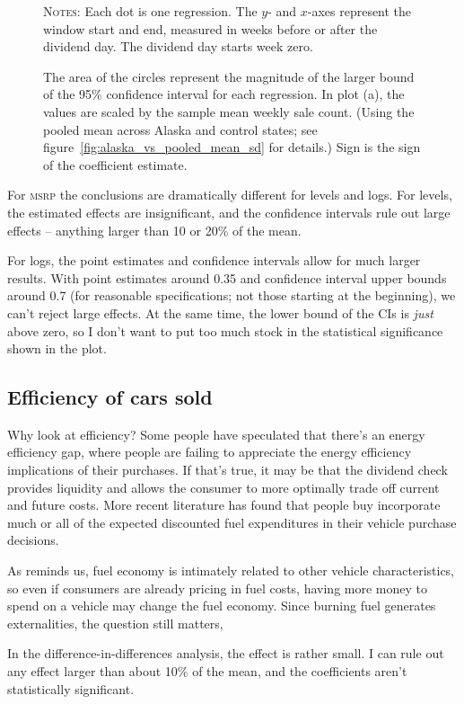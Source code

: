 \documentclass[11pt,letterpaper,oneside]{article}
\newcommand{\msrp}{\textsc{msrp}}
\newcommand{\varWindowDDnotes}{%
Each dot is one regression.
The $y$- and $x$-axes represent the window start and end, measured in weeks before or after the dividend day.
The dividend day starts week zero.

 The area of the circles represent the magnitude of the larger bound of the 95\% confidence interval for each regression.
In plot (a), the values are scaled by the sample mean weekly sale count.
(Using the pooled mean across Alaska and control states; see figure~\ref{fig:alaska_vs_pooled_mean_sd} for details.)
Sign is the sign of the coefficient estimate. %
}
\begin{document}
\begin{doublespacing}
\begin{figure}[!hbtp]
    {\footnotesize
    \textsc{Notes:}
    \varWindowDDnotes
    }
\end{figure}


For \msrp{} the conclusions are dramatically different for levels and logs.
    For levels, the estimated effects are insignificant, and the confidence intervals rule out large effects -- anything larger than 10 or 20\% of the mean.

    For logs, the point estimates and confidence intervals allow for much larger results.
    With point estimates around 0.35 and confidence interval upper bounds around 0.7 (for reasonable specifications; not those starting at the beginning), we can't reject large effects.
    At the same time, the lower bound of the CIs is \emph{just} above zero, so I don't want to put too much stock in the statistical significance shown in the plot.


\subsection{Efficiency of cars sold}

Why look at efficiency?
Some people have speculated that there's an energy efficiency gap, where people are failing to appreciate the energy efficiency implications of their purchases.
If that's true, it may be that the dividend check provides liquidity and allows the consumer to more optimally trade off current and future costs.
More recent literature has found that people buy incorporate much \parencite{allcott2014gasoline} or all \parencite{busse2013consumers, grigolon2014consumer, sallee2016consumers} of the expected discounted fuel expenditures in their vehicle purchase decisions.

As \textcite{kiso2013automobilefueleconomy} reminds us, fuel economy is intimately related to other vehicle characteristics, so even if consumers are already pricing in fuel costs, having more money to spend on a vehicle may change the fuel economy.
Since burning fuel generates externalities, the question still matters,

In the difference\hyp{}in\hyp{}differences analysis, the effect is rather small.
I can rule out any effect larger than about 10\% of the mean, and the coefficients aren't statistically significant.




\end{doublespacing}
\end{document}
